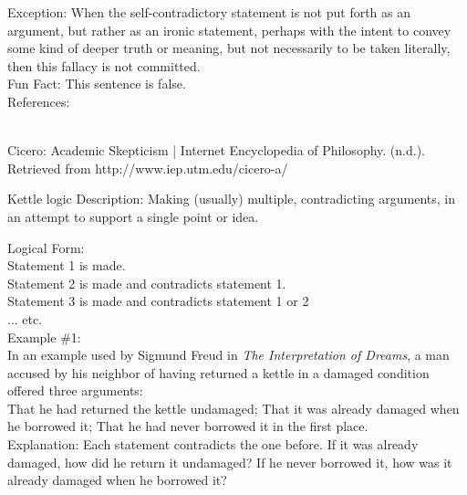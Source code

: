 \documentclass[a4paper,12pt,single,pdftex]{scrbook}
\begin{document}
{    
      Exception: When the self-contradictory statement is not put forth as an argument, but rather as an ironic statement, perhaps with the intent to convey some kind of deeper truth or meaning, but not necessarily to be taken literally, then this fallacy is not committed.
    \\

    
      Fun Fact: This sentence is false.
    \\

    References:

    
      
        
      \\

      
        
          Cicero: Academic Skepticism | Internet Encyclopedia of Philosophy. (n.d.). Retrieved from http://www.iep.utm.edu/cicero-a/
        
      
    
  }


Kettle logic
    Description: Making (usually) multiple, contradicting arguments, in an attempt to support a single point or idea.

    
      Logical Form:
    \\

    
      Statement 1 is made.
    \\

    
      Statement 2 is made and contradicts statement 1.
    \\

    
      Statement 3 is made and contradicts statement 1 or 2
    \\

    
      ... etc.
    \\

    
      Example \#1:
    \\

    
      In an example used by Sigmund Freud in {\it The Interpretation of Dreams}, a man accused by his neighbor of having returned a kettle in a damaged condition offered three arguments:
    \\

    
      That he had returned the kettle undamaged; \newline
That it was already damaged when he borrowed it; \newline
That he had never borrowed it in the first place.
    \\

    
      Explanation: Each statement contradicts the one before. If it was already damaged, how did he return it undamaged? If he never borrowed it, how was it already damaged when he borrowed it?
    \\
\end{document}

